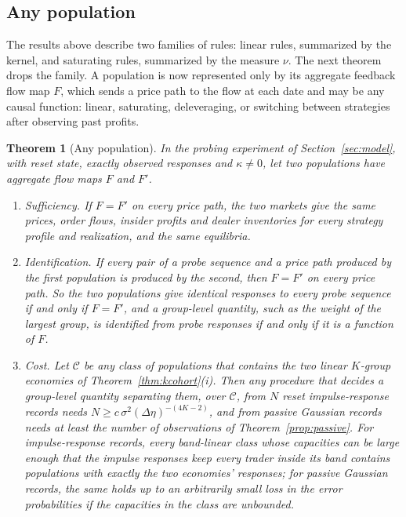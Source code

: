 \documentclass[12pt]{article}
\newtheorem{theorem}{Theorem}[section]
\theoremstyle{definition}
\theoremstyle{remark}
\begin{document}
\subsection{Any population}\label{sec:anypop}

The results above describe two families of rules: linear rules, summarized by the kernel, and saturating rules, summarized by the measure $\nu$. The next theorem drops the family. A population is now represented only by its aggregate feedback flow map $F$, which sends a price path to the flow at each date and may be any causal function: linear, saturating, deleveraging, or switching between strategies after observing past profits.

\begin{theorem}[Any population]\label{thm:anypop}
In the probing experiment of Section~\ref{sec:model}, with reset state, exactly observed responses and $\kappa\ne0$, let two populations have aggregate flow maps $F$ and $F'$.
\begin{enumerate}[label=(\roman*),itemsep=1pt]
\item \emph{Sufficiency.} If $F=F'$ on every price path, the two markets give the same prices, order flows, insider profits and dealer inventories for every strategy profile and realization, and the same equilibria.
\item \emph{Identification.} If every pair of a probe sequence and a price path produced by the first population is produced by the second, then $F=F'$ on every price path. So the two populations give identical responses to every probe sequence if and only if $F=F'$, and a group-level quantity, such as the weight of the largest group, is identified from probe responses if and only if it is a function of $F$.
\item \emph{Cost.} Let $\mathcal C$ be any class of populations that contains the two linear $K$-group economies of Theorem~\ref{thm:kcohort}(i). Then any procedure that decides a group-level quantity separating them, over $\mathcal C$, from $N$ reset impulse-response records needs $N\ge c\,\sigma^2(\Delta\eta)^{-(4K-2)}$, and from passive Gaussian records needs at least the number of observations of Theorem~\ref{prop:passive}. For impulse-response records, every band-linear class whose capacities can be large enough that the impulse responses keep every trader inside its band contains populations with exactly the two economies' responses; for passive Gaussian records, the same holds up to an arbitrarily small loss in the error probabilities if the capacities in the class are unbounded.
\end{enumerate}
\end{theorem}
\end{document}
